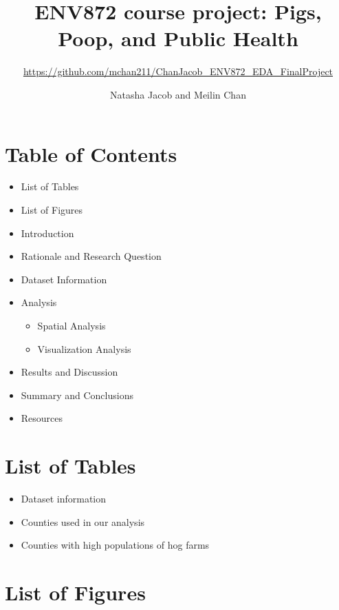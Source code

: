 \documentclass[
  12pt,
]{article}
\title{ENV872 course project: Pigs, Poop, and Public Health}
\subtitle{\url{https://github.com/mchan211/ChanJacob_ENV872_EDA_FinalProject}}
\author{Natasha Jacob and Meilin Chan}
\date{}
\providecommand{\tightlist}{%
  \setlength{\itemsep}{0pt}\setlength{\parskip}{0pt}}
\begin{document}
\maketitle

\newpage

\hypertarget{table-of-contents}{%
\section{Table of Contents}\label{table-of-contents}}

\begin{itemize}
\tightlist
\item
  List of Tables
\item
  List of Figures
\item
  Introduction
\item
  Rationale and Research Question
\item
  Dataset Information
\item
  Analysis

  \begin{itemize}
  \tightlist
  \item
    Spatial Analysis
  \item
    Visualization Analysis
  \end{itemize}
\item
  Results and Discussion
\item
  Summary and Conclusions
\item
  Resources
\end{itemize}

\newpage

\hypertarget{list-of-tables}{%
\section{List of Tables}\label{list-of-tables}}

\begin{itemize}
\tightlist
\item
  Dataset information
\item
  Counties used in our analysis
\item
  Counties with high populations of hog farms
\end{itemize}

\hypertarget{list-of-figures}{%
\section{List of Figures}\label{list-of-figures}}
\end{document}
